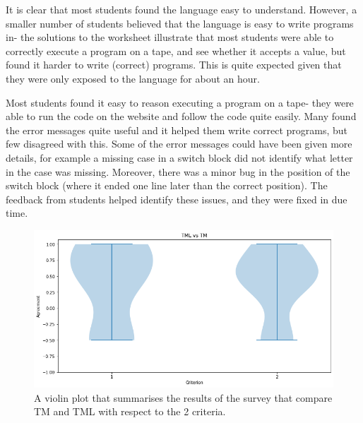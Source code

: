 It is clear that most students found the language easy to understand. However, a smaller number of students believed that the language is easy to write programs in- the solutions to the worksheet illustrate that most students were able to correctly execute a program on a tape, and see whether it accepts a value, but found it harder to write (correct) programs. This is quite expected given that they were only exposed to the language for about an hour.


Most students found it easy to reason executing a program on a tape- they were able to run the code on the website and follow the code quite easily. Many found the error messages quite useful and it helped them write correct programs, but few disagreed with this. Some of the error messages could have been given more details, for example a missing case in a switch block did not identify what letter in the case was missing. Moreover, there was a minor bug in the position of the switch block (where it ended one line later than the correct position). The feedback from students helped identify these issues, and they were fixed in due time. 

\begin{figure}
    \centering
    \includegraphics[scale=0.35]{data/tml-v-tm.png}
    \caption{A violin plot that summarises the results of the survey that compare TM and TML with respect to the 2 criteria.}
    \label{fig:tml-v-tm}
\end{figure}

